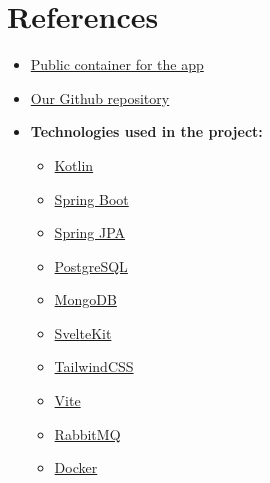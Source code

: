\section{References}
\label{sec:references}

\begin{itemize}
    \item \href{https://github.com/Krissibro/DAT250-Sploinkyboink}{Public container for the app}
    \item \href{https://github.com/Krissibro/DAT250-Sploinkyboink}{Our Github repository}
    \item \textbf{Technologies used in the project:}
    \begin{itemize}
        \item \href{https://kotlinlang.org/}{Kotlin}
        \item \href{https://spring.io/projects/spring-boot}{Spring Boot}
        \item \href{https://spring.io/projects/spring-data-jpa}{Spring JPA}
        \item \href{https://www.postgresql.org/}{PostgreSQL}
        \item \href{https://www.mongodb.com/}{MongoDB}
        \item \href{https://svelte.dev/}{SvelteKit}
        \item \href{https://tailwindcss.com/}{TailwindCSS}
        \item \href{https://vite.dev/}{Vite}
        \item \href{https://www.rabbitmq.com/}{RabbitMQ}
        \item \href{https://www.docker.com/}{Docker}
    \end{itemize}
\end{itemize}
